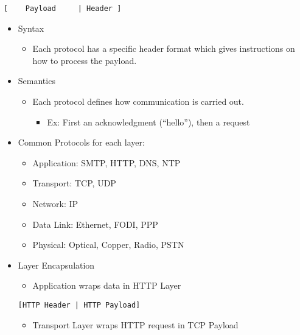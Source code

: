 \begin{verbatim}
[    Payload     | Header ]
\end{verbatim}

\begin{itemize}
\tightlist
\item
  Syntax

  \begin{itemize}
  \tightlist
  \item
    Each protocol has a specific header format which gives instructions
    on how to process the payload.
  \end{itemize}
\item
  Semantics

  \begin{itemize}
  \tightlist
  \item
    Each protocol defines how communication is carried out.

    \begin{itemize}
    \tightlist
    \item
      Ex: First an acknowledgment (``hello''), then a request
    \end{itemize}
  \end{itemize}
\item
  Common Protocols for each layer:

  \begin{itemize}
  \tightlist
  \item
    Application: SMTP, HTTP, DNS, NTP
  \item
    Transport: TCP, UDP
  \item
    Network: IP
  \item
    Data Link: Ethernet, FODI, PPP
  \item
    Physical: Optical, Copper, Radio, PSTN
  \end{itemize}
\item
  Layer Encapsulation

  \begin{itemize}
  \tightlist
  \item
    Application wraps data in HTTP Layer
  \end{itemize}

\begin{verbatim}
[HTTP Header | HTTP Payload]
\end{verbatim}

  \begin{itemize}
  \tightlist
  \item
    Transport Layer wraps HTTP request in TCP Payload
  \end{itemize}


\end{itemize}
